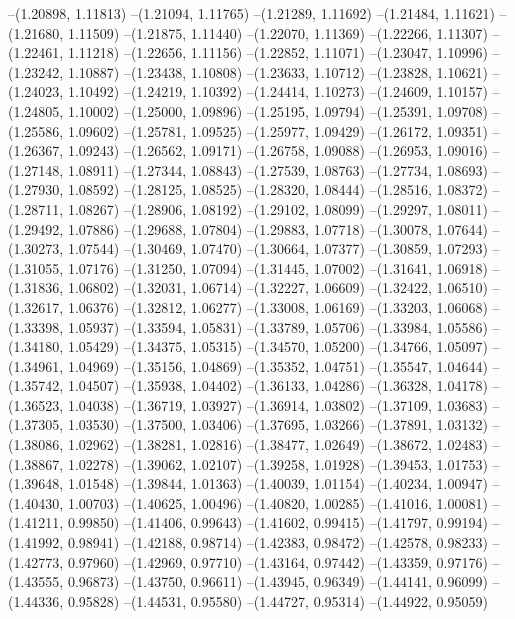 --(1.20898, 1.11813)
--(1.21094, 1.11765)
--(1.21289, 1.11692)
--(1.21484, 1.11621)
--(1.21680, 1.11509)
--(1.21875, 1.11440)
--(1.22070, 1.11369)
--(1.22266, 1.11307)
--(1.22461, 1.11218)
--(1.22656, 1.11156)
--(1.22852, 1.11071)
--(1.23047, 1.10996)
--(1.23242, 1.10887)
--(1.23438, 1.10808)
--(1.23633, 1.10712)
--(1.23828, 1.10621)
--(1.24023, 1.10492)
--(1.24219, 1.10392)
--(1.24414, 1.10273)
--(1.24609, 1.10157)
--(1.24805, 1.10002)
--(1.25000, 1.09896)
--(1.25195, 1.09794)
--(1.25391, 1.09708)
--(1.25586, 1.09602)
--(1.25781, 1.09525)
--(1.25977, 1.09429)
--(1.26172, 1.09351)
--(1.26367, 1.09243)
--(1.26562, 1.09171)
--(1.26758, 1.09088)
--(1.26953, 1.09016)
--(1.27148, 1.08911)
--(1.27344, 1.08843)
--(1.27539, 1.08763)
--(1.27734, 1.08693)
--(1.27930, 1.08592)
--(1.28125, 1.08525)
--(1.28320, 1.08444)
--(1.28516, 1.08372)
--(1.28711, 1.08267)
--(1.28906, 1.08192)
--(1.29102, 1.08099)
--(1.29297, 1.08011)
--(1.29492, 1.07886)
--(1.29688, 1.07804)
--(1.29883, 1.07718)
--(1.30078, 1.07644)
--(1.30273, 1.07544)
--(1.30469, 1.07470)
--(1.30664, 1.07377)
--(1.30859, 1.07293)
--(1.31055, 1.07176)
--(1.31250, 1.07094)
--(1.31445, 1.07002)
--(1.31641, 1.06918)
--(1.31836, 1.06802)
--(1.32031, 1.06714)
--(1.32227, 1.06609)
--(1.32422, 1.06510)
--(1.32617, 1.06376)
--(1.32812, 1.06277)
--(1.33008, 1.06169)
--(1.33203, 1.06068)
--(1.33398, 1.05937)
--(1.33594, 1.05831)
--(1.33789, 1.05706)
--(1.33984, 1.05586)
--(1.34180, 1.05429)
--(1.34375, 1.05315)
--(1.34570, 1.05200)
--(1.34766, 1.05097)
--(1.34961, 1.04969)
--(1.35156, 1.04869)
--(1.35352, 1.04751)
--(1.35547, 1.04644)
--(1.35742, 1.04507)
--(1.35938, 1.04402)
--(1.36133, 1.04286)
--(1.36328, 1.04178)
--(1.36523, 1.04038)
--(1.36719, 1.03927)
--(1.36914, 1.03802)
--(1.37109, 1.03683)
--(1.37305, 1.03530)
--(1.37500, 1.03406)
--(1.37695, 1.03266)
--(1.37891, 1.03132)
--(1.38086, 1.02962)
--(1.38281, 1.02816)
--(1.38477, 1.02649)
--(1.38672, 1.02483)
--(1.38867, 1.02278)
--(1.39062, 1.02107)
--(1.39258, 1.01928)
--(1.39453, 1.01753)
--(1.39648, 1.01548)
--(1.39844, 1.01363)
--(1.40039, 1.01154)
--(1.40234, 1.00947)
--(1.40430, 1.00703)
--(1.40625, 1.00496)
--(1.40820, 1.00285)
--(1.41016, 1.00081)
--(1.41211, 0.99850)
--(1.41406, 0.99643)
--(1.41602, 0.99415)
--(1.41797, 0.99194)
--(1.41992, 0.98941)
--(1.42188, 0.98714)
--(1.42383, 0.98472)
--(1.42578, 0.98233)
--(1.42773, 0.97960)
--(1.42969, 0.97710)
--(1.43164, 0.97442)
--(1.43359, 0.97176)
--(1.43555, 0.96873)
--(1.43750, 0.96611)
--(1.43945, 0.96349)
--(1.44141, 0.96099)
--(1.44336, 0.95828)
--(1.44531, 0.95580)
--(1.44727, 0.95314)
--(1.44922, 0.95059)
